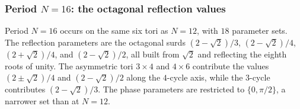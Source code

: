 \subsubsection{Period $N = 16$: the octagonal reflection values}

Period $N = 16$ occurs on the same six tori as $N = 12$, with $18$
parameter sets. The reflection parameters are the octagonal surds
$(2-\sqrt{2})/3$, $(2-\sqrt{2})/4$, $(2+\sqrt{2})/4$, and
$(2-\sqrt{2})/2$, all built from $\sqrt{2}$ and reflecting the eighth
roots of unity. The asymmetric tori $3 \times 4$ and $4 \times 6$
contribute the values $(2 \pm \sqrt{2})/4$ and $(2-\sqrt{2})/2$ along
the $4$-cycle axis, while the $3$-cycle contributes $(2-\sqrt{2})/3$.
The phase parameters are restricted to $\{0, \pi/2\}$, a narrower set
than at $N = 12$.

